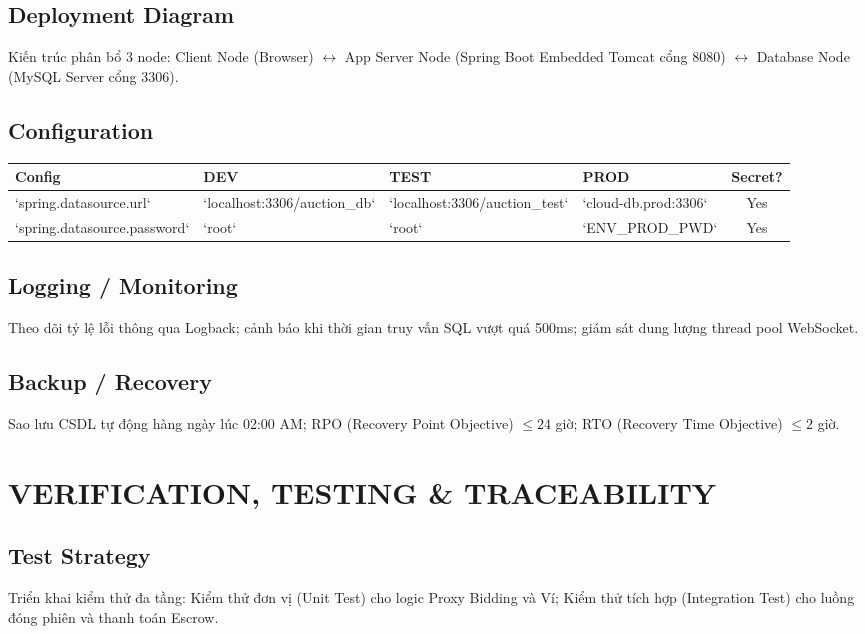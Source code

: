 \documentclass[11pt,a4paper]{article}
\begin{document}
\subsection{Deployment Diagram}
Kiến trúc phân bổ 3 node: Client Node (Browser) $\leftrightarrow$ App Server Node (Spring Boot Embedded Tomcat cổng 8080) $\leftrightarrow$ Database Node (MySQL Server cổng 3306).

\subsection{Configuration}
\begin{table}[H]
    \centering
    \small
    \begin{tabularx}{\textwidth}{|l|l|l|l|c|}
        \hline
        \textbf{Config} & \textbf{DEV} & \textbf{TEST} & \textbf{PROD} & \textbf{Secret?} \\ \hline
        `spring.datasource.url` & `localhost:3306/auction_db` & `localhost:3306/auction_test` & `cloud-db.prod:3306` & Yes \\ \hline
        `spring.datasource.password` & `root` & `root` & `ENV_PROD_PWD` & Yes \\ \hline
    \end{tabularx}
\end{table}

\subsection{Logging / Monitoring}
Theo dõi tỷ lệ lỗi thông qua Logback; cảnh báo khi thời gian truy vấn SQL vượt quá 500ms; giám sát dung lượng thread pool WebSocket.

\subsection{Backup / Recovery}
Sao lưu CSDL tự động hàng ngày lúc 02:00 AM; RPO (Recovery Point Objective) $\le 24$ giờ; RTO (Recovery Time Objective) $\le 2$ giờ.

\section{VERIFICATION, TESTING \& TRACEABILITY}

\subsection{Test Strategy}
Triển khai kiểm thử đa tầng: Kiểm thử đơn vị (Unit Test) cho logic Proxy Bidding và Ví; Kiểm thử tích hợp (Integration Test) cho luồng đóng phiên và thanh toán Escrow.
\end{document}
